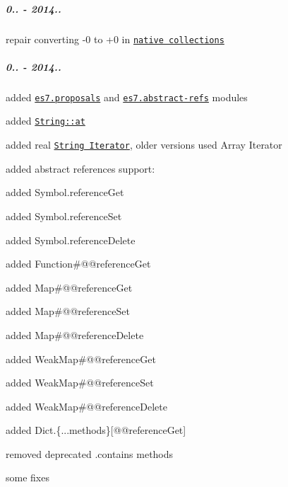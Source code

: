 \subparagraph*{0.. -\/ 2014..}


\begin{DoxyItemize}
\item repair converting -\/0 to +0 in \href{https://github.com/zloirock/core-js/#ecmascript-6-collections}{\tt native collections}
\end{DoxyItemize}

\subparagraph*{0.. -\/ 2014..}


\begin{DoxyItemize}
\item added \href{https://github.com/zloirock/core-js/#ecmascript-7}{\tt {\ttfamily es7.\+proposals}} and \href{https://github.com/zenparsing/es-abstract-refs}{\tt {\ttfamily es7.\+abstract-\/refs}} modules
\item added \href{https://github.com/zloirock/core-js/#ecmascript-7}{\tt {\ttfamily String\+::at}}
\item added real \href{https://github.com/zloirock/core-js/#ecmascript-6-iterators}{\tt {\ttfamily String Iterator}}, older versions used Array Iterator
\item added abstract references support\+:
\begin{DoxyItemize}
\item added {\ttfamily Symbol.\+reference\+Get}
\item added {\ttfamily Symbol.\+reference\+Set}
\item added {\ttfamily Symbol.\+reference\+Delete}
\item added {\ttfamily Function\#@@reference\+Get}
\item added {\ttfamily Map\#@@reference\+Get}
\item added {\ttfamily Map\#@@reference\+Set}
\item added {\ttfamily Map\#@@reference\+Delete}
\item added {\ttfamily Weak\+Map\#@@reference\+Get}
\item added {\ttfamily Weak\+Map\#@@reference\+Set}
\item added {\ttfamily Weak\+Map\#@@reference\+Delete}
\item added {\ttfamily Dict.\{...methods\}\mbox{[}@@reference\+Get\mbox{]}}
\end{DoxyItemize}
\item removed deprecated {\ttfamily .contains} methods
\item some fixes
\end{DoxyItemize}

